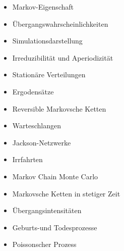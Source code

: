 \begin{module}
\begin{learningoutcomes}
\end{learningoutcomes}

\begin{content}
\begin{itemize}\item Markov-Eigenschaft  \item Übergangswahrscheinlichkeiten  \item Simulationsdarstellung  \item Irreduzibilität und Aperiodizität  \item Stationäre Verteilungen  \item Ergodensätze  \item Reversible Markovsche Ketten  \item Warteschlangen  \item Jackson-Netzwerke  \item Irrfahrten  \item Markov Chain Monte Carlo  \item Markovsche Ketten in stetiger Zeit  \item Übergangsintensitäten  \item Geburts-und Todesprozesse  \item Poissonscher Prozess  \end{itemize}
\end{content}



\end{module}

